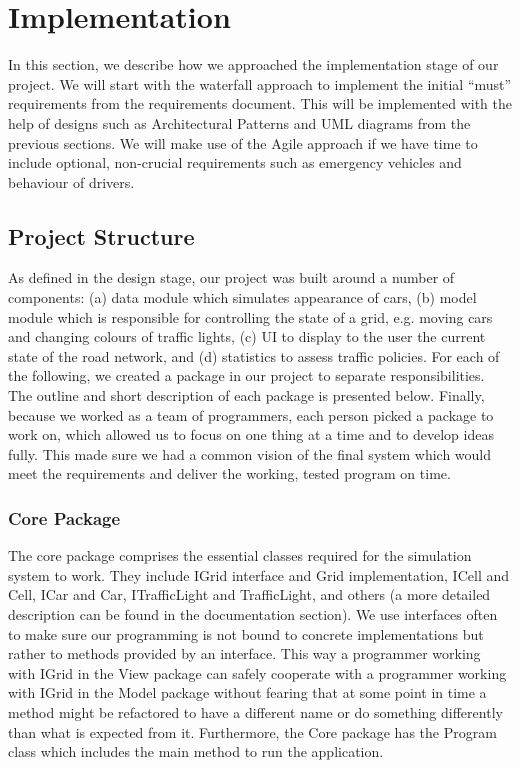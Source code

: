 \documentclass{article}
\begin{document}
	\section{Implementation}
	In this section, we describe how we approached the implementation stage of our project. 
	We will start with the waterfall approach to implement the initial ``must'' requirements from the requirements document. This will be implemented with the help of designs such as Architectural Patterns and UML diagrams from the previous sections. We will make use of the Agile approach if we have time to include optional, non-crucial requirements such as emergency vehicles and behaviour of drivers. 
	
	
	\subsection{Project Structure}
	As defined in the design stage, our project was built around a number of components: (a) data module which simulates appearance of cars, (b) model module which is responsible for controlling the state of a grid, e.g. moving cars and changing colours of traffic lights, (c) UI to display to the user the current state of the road network, and (d) statistics to assess traffic policies. 
	For each of the following, we created a package in our project to separate responsibilities. 
	The outline and short description of each package is presented below. Finally, because we worked as a team of programmers, each person picked a package to work on, which allowed us to focus on one thing at a time and to develop ideas fully. This made sure we had a common vision of the final system which would meet the requirements and deliver the working, tested program on time. 
	
	\subsubsection{Core Package}
	The core package comprises the essential classes required for the simulation system to work. They include IGrid interface and Grid implementation, ICell and Cell, ICar and Car, ITrafficLight and TrafficLight, and others (a more detailed description can be found in the documentation section). 
	We use interfaces often to make sure our programming is not bound to concrete implementations but rather to methods provided by an interface. 
	This way a programmer working with IGrid in the View package can safely cooperate with a programmer working with IGrid in the Model package without fearing that at some point in time a method might be refactored to have a different name or do something differently than what is expected from it. 
	Furthermore, the Core package has the Program class which includes the main method to run the application.\\
	
\end{document}
